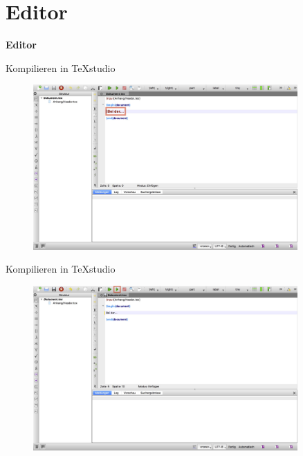 \documentclass["WS\space 16-17\space -\space LaTeX-Kurs\space -\space Praesentation\space -\space 1.tex"]{subfiles}
\begin{document}
%	
%
\section{Editor}
\begin{frame}[c]
	\begin{center}
		\LARGE \textbf{Editor}
	\end{center}
\end{frame}


\begin{frame}[c]{Kompilieren in TeXstudio}
	\begin{figure}[htbp]
\centering
\includegraphics[width=0.9\textwidth]{img/editor/1.jpg}
\end{figure}
\end{frame}


\begin{frame}[c]{Kompilieren in TeXstudio}
	\begin{figure}[htbp]
\centering
\includegraphics[width=0.9\textwidth]{img/editor/2.jpg}
\end{figure}
\end{frame}
\end{document}
